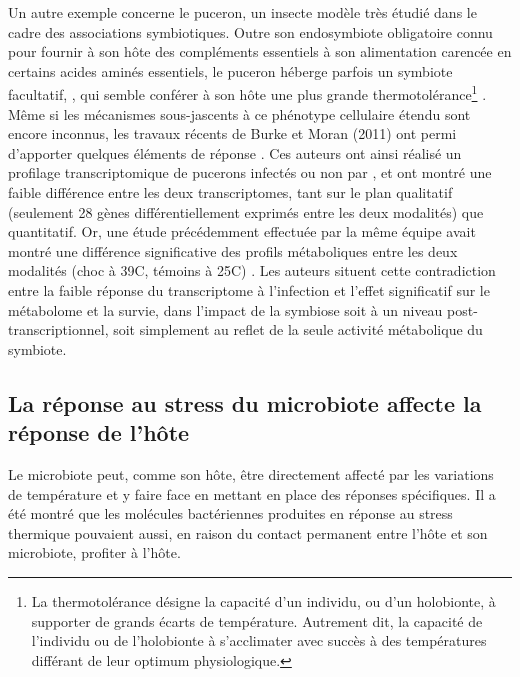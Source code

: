 Un autre exemple concerne le puceron, un insecte modèle très étudié dans le cadre des associations symbiotiques.
Outre son endosymbiote obligatoire  connu pour fournir à son hôte des compléments essentiels à son alimentation carencée en certains acides aminés essentiels, le puceron  héberge parfois un symbiote facultatif, , qui semble conférer à son hôte une plus grande thermotolérance\footnote{La thermotolérance désigne la capacité d'un individu, ou d'un holobionte, à supporter de grands écarts de température. Autrement dit, la capacité de l'individu ou de l'holobionte à s'acclimater avec succès à des températures différant de leur optimum physiologique.} \cite{montllor2002}.
Même si les mécanismes sous-jascents à ce phénotype cellulaire étendu sont encore inconnus, les travaux récents de Burke et Moran (2011) ont permi d'apporter quelques éléments de réponse \cite{burke2011}.
Ces auteurs ont ainsi réalisé un profilage transcriptomique de pucerons infectés ou non par , et ont montré une faible différence entre les deux transcriptomes, tant sur le plan qualitatif (seulement 28 gènes différentiellement exprimés entre les deux modalités) que quantitatif.
Or, une étude précédemment effectuée par la même équipe avait montré une différence significative des profils métaboliques entre les deux modalités (choc à 39\textdegree{}C, témoins à 25\textdegree{}C) \cite{burke2009}.
Les auteurs situent cette contradiction entre la faible réponse du transcriptome à l'infection et l'effet significatif sur le métabolome et la survie, dans l'impact de la symbiose soit à un niveau post-transcriptionnel, soit simplement au reflet de la seule activité métabolique du symbiote.


\subsection{La réponse au stress du microbiote affecte la réponse de l'hôte}

Le microbiote peut, comme son hôte, être directement affecté par les variations de température et y faire face en mettant en place des réponses spécifiques.
Il a été montré que les molécules bactériennes produites en réponse au stress thermique pouvaient aussi, en raison du contact permanent entre l'hôte et son microbiote, profiter à l'hôte.

